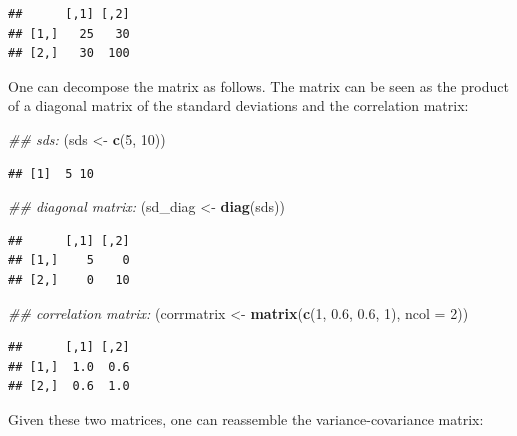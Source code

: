 \documentclass[12pt,]{krantz}
\newenvironment{Shaded}{\begin{snugshade}}{\end{snugshade}}
\newcommand{\CommentTok}[1]{\textcolor[rgb]{0.56,0.35,0.01}{\textit{#1}}}
\newcommand{\DataTypeTok}[1]{\textcolor[rgb]{0.13,0.29,0.53}{#1}}
\newcommand{\DecValTok}[1]{\textcolor[rgb]{0.00,0.00,0.81}{#1}}
\newcommand{\FloatTok}[1]{\textcolor[rgb]{0.00,0.00,0.81}{#1}}
\newcommand{\KeywordTok}[1]{\textcolor[rgb]{0.13,0.29,0.53}{\textbf{#1}}}
\newcommand{\NormalTok}[1]{#1}
\newcommand{\OperatorTok}[1]{\textcolor[rgb]{0.81,0.36,0.00}{\textbf{#1}}}
\newcommand{\StringTok}[1]{\textcolor[rgb]{0.31,0.60,0.02}{#1}}
\begin{document}
\begin{verbatim}
##      [,1] [,2]
## [1,]   25   30
## [2,]   30  100
\end{verbatim}

One can decompose the matrix as follows. The matrix can be seen as the product of a diagonal matrix of the standard deviations and the correlation matrix:

\begin{Shaded}
\begin{Highlighting}[]
\CommentTok{## sds:}
\NormalTok{(sds <-}\StringTok{ }\KeywordTok{c}\NormalTok{(}\DecValTok{5}\NormalTok{, }\DecValTok{10}\NormalTok{))}
\end{Highlighting}
\end{Shaded}

\begin{verbatim}
## [1]  5 10
\end{verbatim}

\begin{Shaded}
\begin{Highlighting}[]
\CommentTok{## diagonal matrix:}
\NormalTok{(sd_diag <-}\StringTok{ }\KeywordTok{diag}\NormalTok{(sds))}
\end{Highlighting}
\end{Shaded}

\begin{verbatim}
##      [,1] [,2]
## [1,]    5    0
## [2,]    0   10
\end{verbatim}

\begin{Shaded}
\begin{Highlighting}[]
\CommentTok{## correlation matrix:}
\NormalTok{(corrmatrix <-}\StringTok{ }\KeywordTok{matrix}\NormalTok{(}\KeywordTok{c}\NormalTok{(}\DecValTok{1}\NormalTok{, }\FloatTok{0.6}\NormalTok{, }\FloatTok{0.6}\NormalTok{, }\DecValTok{1}\NormalTok{), }\DataTypeTok{ncol =} \DecValTok{2}\NormalTok{))}
\end{Highlighting}
\end{Shaded}

\begin{verbatim}
##      [,1] [,2]
## [1,]  1.0  0.6
## [2,]  0.6  1.0
\end{verbatim}

Given these two matrices, one can reassemble the variance-covariance matrix:

\begin{Shaded}
\end{Shaded}
\end{document}

